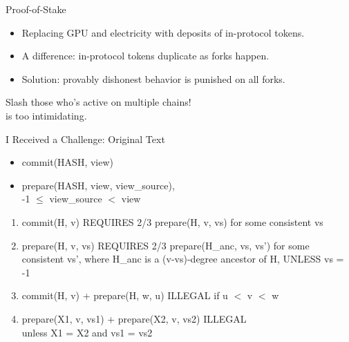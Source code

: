 \documentclass{beamer}
\begin{document}
\begin{frame}{Proof-of-Stake}

\begin{itemize}
\item Replacing GPU and electricity with deposits of in-protocol tokens.
\item A difference: in-protocol tokens duplicate as forks happen.
\item Solution: provably dishonest behavior is punished on all forks.
\end{itemize}

\alert{Slash those who's active on multiple chains!}\\ is too intimidating.
\end{frame}


\begin{frame}{I Received a Challenge: Original Text}


  \begin{itemize}
  \item commit(HASH, view)
  \item prepare(HASH, view, view\_source),\\ -1 $\le$ view\_source $<$ view
  \end{itemize}


  \begin{enumerate}
    \item commit(H, v) REQUIRES 2/3 prepare(H, v, vs) for some consistent vs
    \item prepare(H, v, vs) REQUIRES 2/3 prepare(H\_anc, vs, vs') for some consistent vs', where H\_anc is a (v-vs)-degree ancestor of H, UNLESS vs = -1
    \item commit(H, v) + prepare(H, w, u) ILLEGAL if u $<$ v $<$ w
    \item prepare(X1, v, vs1) + prepare(X2, v, vs2) ILLEGAL\\ unless X1 = X2 and vs1 = vs2
  \end{enumerate}

\end{frame}
\end{document}
